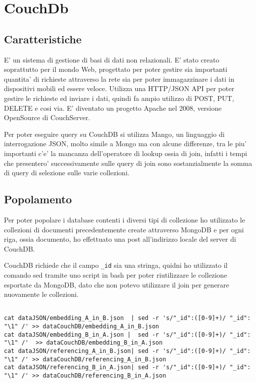 \chapter{CouchDb}

\section{Caratteristiche}

E' un sistema di gestione di basi di dati non relazionali. E' stato creato soprattutto per il mondo Web, progettato per poter gestire sia importanti quantita' di richieste attraverso
la rete sia per poter immagazzinare i dati in dispositivi mobili ed essere veloce. Utilizza una HTTP/JSON API per poter gestire le richieste ed inviare i dati, quindi
fa ampio utilizzo di POST, PUT, DELETE e cosi via. E' diventato un progetto Apache nel 2008, versione OpenSource di CouchServer.

Per poter eseguire query su CouchDB si utilizza Mango, un linguaggio di interrogazione JSON, molto simile a Mongo ma con alcune differenze, tra le piu'
importanti c'e' la mancanza dell'operatore di lookup ossia di join, infatti i tempi che presentero' successivamente sulle query di join sono 
sostanzialmente la somma di query di selezione sulle varie collezioni.
\section{Popolamento}

Per poter popolare i database contenti i diversi tipi di collezione ho utilizzato le collezioni di documenti precedentemente create attraverso MongoDB e per ogni 
riga, ossia documento, ho effettuato una post all'indirizzo locale del server di CouchDB.

CouchDB richiede che il campo \verb|_id| sia una stringa, quidni ho utilizzato il comando sed tramite uno script in bash per poter riutilizzare le collezione esportate
 da MongoDB, dato che non potevo utilizzare il join per generare nuovamente le collezioni.

\begin{Verbatim}

cat dataJSON/embedding_A_in_B.json  | sed -r 's/"_id":([0-9]+)/ "_id": "\1" /' >> dataCouchDB/embedding_A_in_B.json
cat dataJSON/embedding_B_in_A.json |  sed -r 's/"_id":([0-9]+)/ "_id": "\1" /'  >> dataCouchDB/embedding_B_in_A.json
cat dataJSON/referencing_A_in_B.json| sed -r 's/"_id":([0-9]+)/ "_id": "\1" /' >> dataCouchDB/referencing_A_in_B.json
cat dataJSON/referencing_B_in_A.json| sed -r 's/"_id":([0-9]+)/ "_id": "\1" /' >> dataCouchDB/referencing_B_in_A.json

\end{Verbatim}

